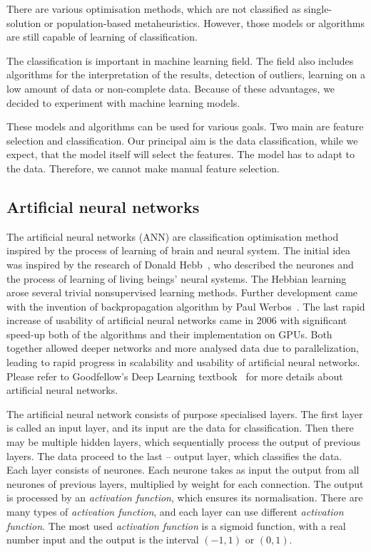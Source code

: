 \documentclass[
    digital,    %
    oneside,    %
    color,
    11pt,
    nocover,
    notable,
    nolof,
    nolot,
]{fithesis3}
\begin{document}
There are various optimisation methods, which are not classified as single-solution or population-based metaheuristics. However, those models or algorithms are still capable of learning of classification.

The classification is important in machine learning field. The field also includes algorithms for the interpretation of the results, detection of outliers, learning on a low amount of data or non-complete data. Because of these advantages, we decided to experiment with machine learning models.

These models and algorithms can be used for various goals. Two main are feature selection and classification. Our principal aim is the data classification, while we expect, that the model itself will select the features. The model has to adapt to the data. Therefore, we cannot make manual feature selection.

\subsection{Artificial neural networks}
\label{subsec:opt-other-ann}

The artificial neural networks (ANN) are classification optimisation method inspired by the process of learning of brain and neural system. The initial idea was inspired by the research of Donald Hebb~\cite{hebb49learning}, who described the neurones and the process of learning of living beings' neural systems. The Hebbian learning arose several trivial nonsupervised learning methods. Further development came with the invention of backpropagation algorithm by Paul Werbos~\cite{werbos75beyondThesis}. The last rapid increase of usability of artificial neural networks came in 2006 with significant speed-up both of the algorithms and their implementation on GPUs. Both together allowed deeper networks and more analysed data due to parallelization, leading to rapid progress in scalability and usability of artificial neural networks. Please refer to Goodfellow's Deep Learning textbook~\cite{Goodfellow-et-al-2016} for more details about artificial neural networks.

The artificial neural network consists of purpose specialised layers. The first layer is called an input layer, and its input are the data for classification. Then there may be multiple hidden layers, which sequentially process the output of previous layers. The data proceed to the last -- output layer, which classifies the data. Each layer consists of neurones. Each neurone takes as input the output from all neurones of previous layers, multiplied by weight for each connection. The output is processed by an \textit{activation function}, which ensures its normalisation. There are many types of \textit{activation function}, and each layer can use different \textit{activation function}. The most used \textit{activation function} is a sigmoid function, with a real number input and the output is the interval $(-1, 1)$ or $(0, 1)$.
\end{document}
